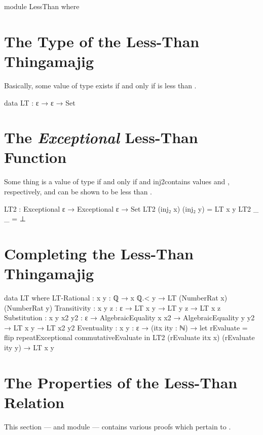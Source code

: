 \documentclass{report}
\begin{document}
\begin{code}
  module LessThan where
\end{code}

\section{The Type of the Less-Than Thingamajig}
Basically, some value of type    exists if and only if  is less than .

\begin{code}
    data LT : ε → ε → Set
\end{code}

\section{The \emph{Exceptional} Less-Than Function}
Some thing is a value of type    if and only if  and  \glspl{inj2contain} values  and , respectively, and  can be shown to be less than .

\begin{code}
    LT2 : Exceptional ε → Exceptional ε → Set
    LT2 (inj₂ x) (inj₂ y) = LT x y
    LT2 _ _ = ⊥
\end{code}

\section{Completing the Less-Than Thingamajig}

\begin{code}
    data LT where
      LT-Rational :
        {x y : ℚ} → x ℚ.< y → LT (NumberRat x) (NumberRat y)
      Transitivity : {x y z : ε} → LT x y → LT y z → LT x z
      Substitution : {x y x2 y2 : ε} →
                     AlgebraicEquality x x2 →
                     AlgebraicEquality y y2 →
                     LT x y → LT x2 y2
      Eventuality :
        {x y : ε} →
        (itx ity : ℕ) →
        let rEvaluate = flip repeatExceptional commutativeEvaluate in
        LT2 (rEvaluate itx x) (rEvaluate ity y) →
        LT x y
\end{code}

\section{The Properties of the Less-Than Relation}
This section --- and module --- contains various proofs which pertain to .
\end{document}

